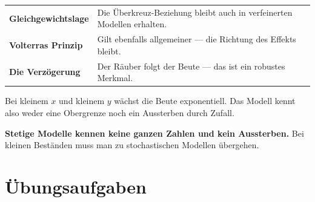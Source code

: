 \begin{warnung}
\begin{center}
\renewcommand{\arraystretch}{1.5}
\begin{tabular}{@{}P{3.0cm}P{5.6cm}@{}}
\toprule
\textbf{Gleich\-gewichtslage} & Die Überkreuz-Beziehung bleibt auch in verfeinerten Modellen erhalten.\\
\textbf{Volterras Prinzip} & Gilt ebenfalls allgemeiner --- die Richtung des Effekts bleibt.\\
\textbf{Die Verzögerung} & Der Räuber folgt der Beute --- das ist ein robustes Merkmal.\\
\bottomrule
\end{tabular}
\end{center}
\end{warnung}

\begin{warnung}
Bei kleinem $x$ und kleinem $y$ wächst die Beute exponentiell. Das Modell kennt also weder eine Obergrenze noch ein Aussterben durch Zufall.

\begin{center}
\begin{minipage}{0.88\textwidth}
\end{minipage}
\end{center}

\begin{center}
\begin{minipage}{0.9\textwidth}
\textbf{Stetige Modelle kennen keine ganzen Zahlen und kein Aussterben.} Bei kleinen Beständen muss man zu stochastischen Modellen übergehen.
\end{minipage}
\end{center}
\end{warnung}

\section{Übungsaufgaben}

